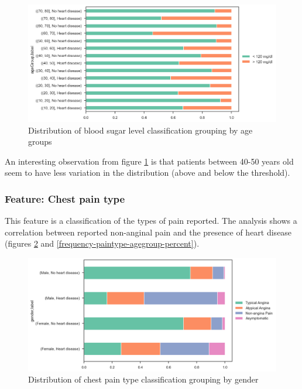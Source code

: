 \begin{figure}
    \caption{Distribution of blood sugar level classification grouping by age groups}\label{frequency-bloodsugar-agegroup-percent}
    \centering
    \includegraphics[width=\linewidth]{media/frequency-08-agegroup-bloodsugar.png}
\end{figure}

An interesting observation from figure \ref{frequency-bloodsugar-agegroup-percent} is that patients between 40-50 years
old seem to have less variation in the distribution (above and below the threshold).

\subsubsection{Feature: Chest pain type}

This feature is a classification of the types of pain reported. The analysis shows a correlation between reported
non-anginal pain and the presence of heart disease (figures \ref{frequency-paintype-gender-percent} and
\ref{frequency-paintype-agegroup-percent}).

\begin{figure}
    \caption{Distribution of chest pain type classification grouping by gender}\label{frequency-paintype-gender-percent}
    \centering
    \includegraphics[width=\linewidth]{media/frequency-09-gender-paintype.png}
\end{figure}

